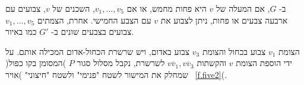 \clearpage
%
%
%
%
%  
%

ב-%
$G$,
אם המעלה של
$v$
היא פחות מחמש,
או אם
$v_1,\ldots,v_5$,
השכנים של
$v$,
צבועים עם ארבעה צבעים או פחות, ניתן לצבוע את
$v$
עם הצבע החמישי.
אחרת, הצמתים
$v_1,\ldots,v_5$
צבועים בצבעים שונים ב-%
$G'$
כמו באיור.

הצומת
$v_1$
צבוע בכחול והצומת 
$v_3$
צבוע באדום, ויש שרשרת הכחול-אדום המכילה אותם. על ידי הוספת הצומת 
$v$
והקשתות
$\overline{vv_1},\overline{vv_3}$
לשרשרת, נקבל מסלול סגור
$P$
)המסומן בקו כפול( שמחלק את המישור לשטח "פנימי" ולשטח "חיצוני" )אויר~%
\ref{f.five2}(.

